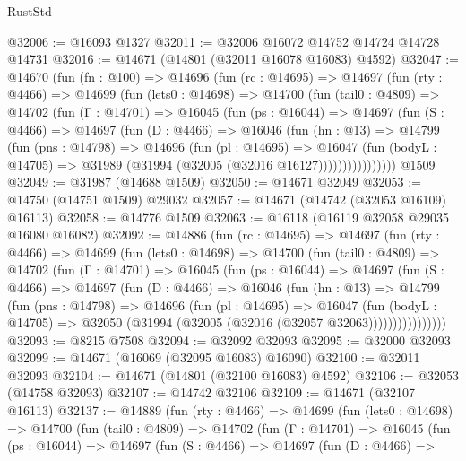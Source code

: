 \begin{lexlean}{RustStd}
\begin{coremodule}
@32006 := @16093 @1327
@32011 := @32006 @16072 @14752 @14724 @14728 @14731
@32016 := @14671 (@14801 (@32011 @16078 @16083) @4592)
@32047 := @14670
    (fun (fn : @100) =>
    @14696
      (fun (rc : @14695) =>
      @14697
        (fun (rty : @4466) =>
        @14699
          (fun (lets0 : @14698) =>
          @14700
            (fun (tail0 : @4809) =>
            @14702
              (fun (Γ : @14701) =>
              @16045
                (fun (ps : @16044) =>
                @14697
                  (fun (S : @4466) =>
                  @14697
                    (fun (D : @4466) =>
                    @16046
                      (fun (hn : @13) =>
                      @14799
                        (fun (pns : @14798) =>
                        @14696
                          (fun (pl : @14695) =>
                          @16047
                            (fun (bodyL : @14705) =>
                            @31989 (@31994 (@32005 (@32016 @16127))))))))))))))))
    @1509
@32049 := @31987 (@14688 @1509)
@32050 := @14671 @32049
@32053 := @14750 (@14751 @1509) @29032
@32057 := @14671 (@14742 (@32053 @16109) @16113)
@32058 := @14776 @1509
@32063 := @16118 (@16119 @32058 @29035 @16080 @16082)
@32092 := @14886
    (fun (rc : @14695) =>
    @14697
      (fun (rty : @4466) =>
      @14699
        (fun (lets0 : @14698) =>
        @14700
          (fun (tail0 : @4809) =>
          @14702
            (fun (Γ : @14701) =>
            @16045
              (fun (ps : @16044) =>
              @14697
                (fun (S : @4466) =>
                @14697
                  (fun (D : @4466) =>
                  @16046
                    (fun (hn : @13) =>
                    @14799
                      (fun (pns : @14798) =>
                      @14696
                        (fun (pl : @14695) =>
                        @16047
                          (fun (bodyL : @14705) =>
                          @32050 (@31994 (@32005 (@32016 (@32057 @32063))))))))))))))))
@32093 := @8215 @7508
@32094 := @32092 @32093
@32095 := @32000 @32093
@32099 := @14671 (@16069 (@32095 @16083) @16090)
@32100 := @32011 @32093
@32104 := @14671 (@14801 (@32100 @16083) @4592)
@32106 := @32053 (@14758 @32093)
@32107 := @14742 @32106
@32109 := @14671 (@32107 @16113)
@32137 := @14889
    (fun (rty : @4466) =>
    @14699
      (fun (lets0 : @14698) =>
      @14700
        (fun (tail0 : @4809) =>
        @14702
          (fun (Γ : @14701) =>
          @16045
            (fun (ps : @16044) =>
            @14697
              (fun (S : @4466) =>
              @14697
                (fun (D : @4466) =>

\end{coremodule}
\end{lexlean}
